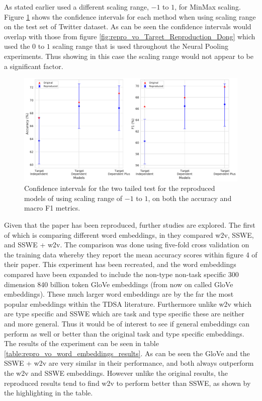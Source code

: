 As stated earlier \citet{wang-etal-2017-tdparse} used a different scaling range, $-1$ to $1$, for MinMax scaling. Figure \ref{fig:repro_vo_Target_Wang_Scaled_Reproduction_Dong} shows the confidence intervals for each method when using \citet{wang-etal-2017-tdparse} scaling range on the test set of \citet{dong-etal-2014-adaptive} Twitter dataset. As can be seen the confidence intervals would overlap with those from figure \ref{fig:repro_vo_Target_Reproduction_Dong} which used the $0$ to $1$ scaling range that is used throughout the Neural Pooling experiments. Thus showing in this case the scaling range would not appear to be a significant factor.

\begin{figure}[!h]
    \centering
    \includegraphics[scale=0.37]{images/reproducibility/vo/Target_Wang_Scaled_Reproduction_Dong.pdf}
    \caption{Confidence intervals for the two tailed test for the reproduced models of \citet{vo2015target} using \citet{wang-etal-2017-tdparse} scaling range of $-1$ to $1$, on both the accuracy and macro F1 metrics.}
    \label{fig:repro_vo_Target_Wang_Scaled_Reproduction_Dong}
\end{figure}

Given that the paper has been reproduced, further studies are explored. The first of which is comparing different word embeddings, in \citet{vo2015target} they compared w2v, SSWE, and SSWE + w2v. The comparison was done using five-fold cross validation on the training data whereby they report the mean accuracy scores within figure 4 of their paper. This experiment has been recreated, and the word embeddings compared have been expanded to include the non-type non-task specific 300 dimension 840 billion token GloVe embeddings \citep{pennington-etal-2014-glove} (from now on called GloVe embeddings). These much larger word embeddings are by the far the most popular embeddings within the TDSA literature. Furthermore unlike w2v which are type specific and SSWE which are task and type specific these are neither and more general. Thus it would be of interest to see if general embeddings can perform as well or better than the original task and type specific embeddings. The results of the experiment can be seen in table \ref{table:repro_vo_word_embeddings_results}. As can be seen the GloVe and the SSWE + w2v are very similar in their performance, and both always outperform the w2v and SSWE embeddings. However unlike the original results, the reproduced results tend to find w2v to perform better than SSWE, as shown by the highlighting in the table.  

